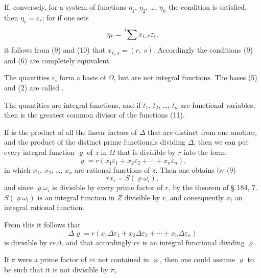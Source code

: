 
If, conversely, for a system of functions $\eta_1$, $\eta_2$, \dots, $\eta_n$ the
condition
is satisfied, then $\eta_r = \varepsilon_r$; for if one sets
\[ \eta_r = \sideset{^i}{}\sum x_{i,\,r}\varepsilon_i, \]
it follows from (9) and (10) that $x_{r,\,s} = (r,\ s)$. Accordingly the conditions
(9) and (6) are completely equivalent.

The quantities $\varepsilon_i$ form a basis of $\Omega$, but are not
integral functions. The bases (5) and (2) are called .

The quantities
are integral functions, and if $t_1$, $t_2$, \dots, $t_n$ are functional variables,
then
is the greatest common divisor of the functions (11).

If
is the product of all the linear factors of $\Delta$ that are distinct from
one another, and
the product of the distinct prime functionals dividing $\Delta$,
then we can put every integral function $\varrho$ of $z$ in $\Omega$ that is
divisible by $r$ into the form:
\[ \varrho = r(x_1\varepsilon_1 + x_2\varepsilon_2 + \cdots + x_n\varepsilon_n), \]
in which $x_1$, $x_2$, \dots, $x_n$ are rational functions of $z$. Then
one obtains by (9)
\[ rx_i = S(\varrho\omega_i), \]
and since $\varrho\omega_i$ is divisible by every prime factor of $r$, by the
theorem of § 184, 7. $S(\varrho\omega_i)$ is an integral function in $Z$
divisible by $r$, and consequently $x_i$ an integral rational function.

From this it follows that
\[ \Delta\varrho = r(x_1\Delta\varepsilon_1 + x_2\Delta\varepsilon_2 + \cdots + x_n\Delta\varepsilon_n) \]
is divisible by $r\varepsilon\Delta$, and that accordingly $r\varepsilon$ is an integral
functional dividing $\varrho$.

If $\pi$ were a prime factor of $r\varepsilon$ not contained in $\varkappa$, then
one could assume $\varrho$ to be such that it is not divisible by $\pi$,
